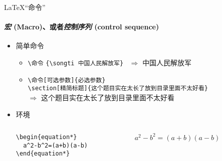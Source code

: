 \begin{frame}[fragile]{\LaTeX{}“命令”}
  \framesubtitle{\emph{宏} (Macro)、或者\emph{控制序列} (control sequence)}
  \begin{itemize}
    \item 简单命令
          \begin{itemize}
            \item \verb|\命令|\hspace{2em}
                  \verb|{\songti 中国人民解放军}| ~$\Rightarrow$ {\songti 中国人民解放军}
            \item \verb|\命令[可选参数]{必选参数}|\\
                  \verb|\section[精简标题]{这个题目实在太长了放到目录里面不太好看}|\\
                  $\Rightarrow$ { \hspace{1em} \songti 这个题目实在太长了放到目录里面不太好看}
          \end{itemize}
    \item 环境
          \begin{columns}[c]
            \begin{column}{0.45\textwidth}
              \begin{lstlisting}[basicstyle=\ttfamily]
\begin{equation*}
  a^2-b^2=(a+b)(a-b)
\end{equation*}
\end{lstlisting}
            \end{column}\hspace{1em}
            \begin{column}{0.45\textwidth}
              $ a^2-b^2=(a+b)(a-b)$
            \end{column}
          \end{columns}
  \end{itemize}
\end{frame}

